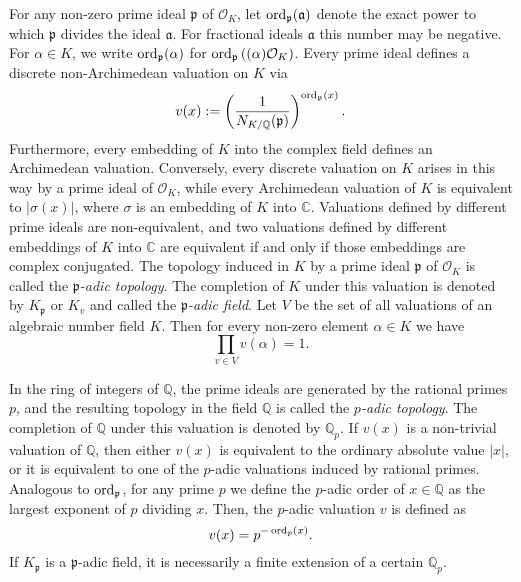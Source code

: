 For any non-zero prime ideal $\mathfrak{p}$ of $\mathcal{O}_K$, let $\operatorname{ord}_{\mathfrak{p}}(\mathfrak{a})$ denote the exact power to which $\mathfrak{p}$ divides the ideal $\mathfrak{a}$. For fractional ideals $\mathfrak{a}$ this number may be negative. For $\alpha \in K$, we write $\operatorname{ord}_{\mathfrak{p}}(\alpha)$ for $\operatorname{ord}_{\mathfrak{p}}\left((\alpha)\mathcal{O}_K\right)$. Every prime ideal defines a discrete non-Archimedean valuation on $K$ via
\[v(x):= \left(\frac{1}{N_{K/\mathbb{Q}}(\mathfrak{p})}\right)^{\operatorname{ord}_{\mathfrak{p}}(x)}.\]
Furthermore, every embedding of $K$ into the complex field defines an Archimedean valuation. Conversely, every discrete valuation on $K$ arises in this way by a prime ideal of $\mathcal{O}_K$, while every Archimedean valuation of $K$ is equivalent to $|\sigma(x)|$, where $\sigma$ is an embedding of $K$ into $\mathbb{C}$. Valuations defined by different prime ideals are non-equivalent, and two valuations defined by different embeddings of $K$ into $\mathbb{C}$ are equivalent if and only if those embeddings are complex conjugated. The topology induced in $K$ by a prime ideal $\mathfrak{p}$ of $\mathcal{O}_K$ is called the \textit{$\mathfrak{p}$-adic topology}. The completion of $K$ under this valuation is denoted by $K_{\mathfrak{p}}$ or $K_v$ and called the \textit{$\mathfrak{p}$-adic field}. Let $V$ be the set of all valuations of an algebraic number field $K$. Then for every non-zero element $\alpha \in K$ we have 
\[\prod_{v \in V} v(\alpha) = 1.\]

In the ring of integers of $\mathbb{Q}$, the prime ideals are generated by the rational primes $p$, and the resulting topology in the field $\mathbb{Q}$ is called the \textit{$p$-adic topology}. The completion of $\mathbb{Q}$ under this valuation is denoted by $\mathbb{Q}_p$. If $v(x)$ is a non-trivial valuation of $\mathbb{Q}$, then either $v(x)$ is equivalent to the ordinary absolute value $|x|$, or it is equivalent to one of the $p$-adic valuations induced by rational primes. Analogous to $\operatorname{ord}_{\mathfrak{p}}$, for any prime $p$ we define the $p$-adic order of $x \in \mathbb{Q}$ as the largest exponent of $p$ dividing $x$. Then, the $p$-adic valuation $v$ is defined as
\[v(x) = p^{-\operatorname{ord}_p(x)}.\]
If $K_{\mathfrak{p}}$ is a $\mathfrak{p}$-adic field, it is necessarily a finite extension of a certain $\mathbb{Q}_p$. 


